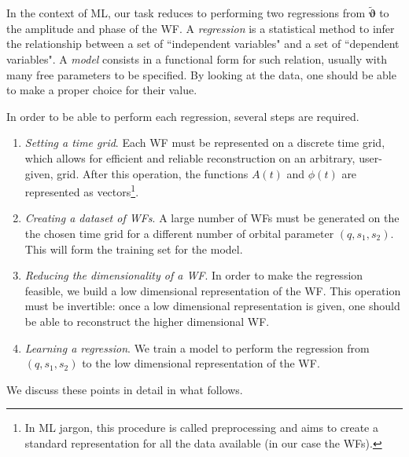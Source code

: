\documentclass[twocolumn,showpacs,preprintnumbers,nofootinbib,prd,
superscriptaddress,10pt]{revtex4-1}
\begin{document}
In the context of ML, our task reduces to performing two regressions from $\tilde{\boldsymbol{\vartheta}}$ to the amplitude and phase of the WF. 
A {\it regression} is a statistical method to infer the relationship between a set of ``independent variables" and a set of ``dependent variables". A {\it model} consists in a functional form for such relation, usually with many free parameters to be specified. By looking at the data, one should be able to make a proper choice for their value.

In order to be able to perform each regression, several steps are required.

\begin{enumerate}[label=(\Alph*)]
	\item \textit{Setting a time grid}. Each WF must be represented on a discrete time grid, which allows for efficient and reliable reconstruction on an arbitrary, user-given, grid. After this operation, the functions $A(t)$ and $\phi(t)$ are represented as vectors\footnote{
In ML jargon, this procedure is called preprocessing and aims to create a standard representation for all the data available (in our case the WFs).
}.
	\item \textit{Creating a dataset of WFs}. A large number of WFs must be generated on the the chosen time grid for a different number of orbital parameter $(q,s_1,s_2)$. This will form the training set for the model.
	\item \textit{Reducing the dimensionality of a WF}. In order to make the regression feasible, we build a low dimensional representation of the WF. This operation must be invertible: once a low dimensional representation is given, one should be able to reconstruct the higher dimensional WF.
	\item \textit{Learning a regression}. We train a model to perform the regression from $(q, s_1, s_2)$ to the low dimensional representation of the WF.
\end{enumerate}
We discuss these points in detail in what follows.

%
\end{document}
